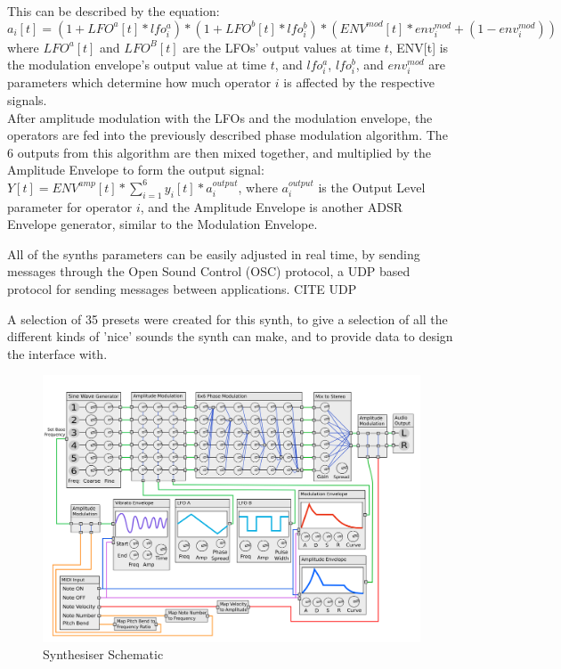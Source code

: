 \documentclass[11pt, oneside]{report}   	%
\begin{document}
This can be described by the equation:
 \begin{equation}
 	a_i[t] = (1 + LFO^a[t]*lfo^{a}_i)*(1 + LFO^b[t]*lfo^{b}_i)*(ENV^{mod}[t]*env^{mod}_i + (1-env^{mod}_i))
 \end{equation}
where $LFO^a[t]$ and $LFO^B[t]$ are the LFOs' output values at time $t$, ENV[t] is the modulation envelope's output value at time $t$, and $lfo^{a}_i$, $lfo^{b}_i$, and $env^{mod}_{i}$ are parameters which determine how much operator $i$ is affected by the respective signals.\\
After amplitude modulation with the LFOs and the modulation envelope, the operators are fed into the previously described phase modulation algorithm. The 6 outputs from this algorithm are then mixed together, and multiplied by the Amplitude Envelope to form the output signal: $Y[t] = ENV^{amp}[t]*\sum_{i=1}^{6}y_i[t]*a_i^{output}$, where $a_i^{output}$ is the Output Level parameter for operator $i$, and the Amplitude Envelope is another ADSR Envelope generator, similar to the Modulation Envelope.

All of the synths parameters can be easily adjusted in real time, by sending messages through the Open Sound Control (OSC) protocol, a UDP based protocol for sending messages between applications. CITE UDP

A selection of 35 presets were created for this synth, to give a selection of all the different kinds of 'nice' sounds the synth can make, and to provide data to design the interface with.
\begin{figure}[h] \label{fig:SynthSchematic}
	\centering
	\hspace*{-2cm}
	\includegraphics[width = 7.8in]{SynthSchematic.png}
	\caption{Synthesiser Schematic}
\end{figure}
\end{document}
